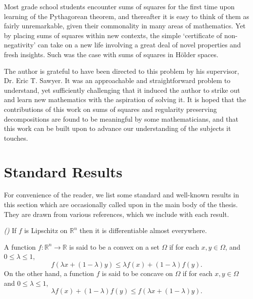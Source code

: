 \documentclass[oneside,hidelinks,indentfirst,10pt]{book}
\begin{document}
Most grade school students encounter sums of squares for the first time upon learning of the Pythagorean theorem, and thereafter it is easy to think of them as fairly unremarkable, given their commonality in many areas of mathematics. Yet by placing sums of squares within new contexts, the simple `certificate of non-negativity' can take on a new life involving a great deal of novel properties and fresh insights. Such was the case with sums of squares in H\"older spaces.


The author is grateful to have been directed to this problem by his supervisor, Dr. Eric T. Sawyer. It was an approachable and straightforward problem to understand, yet sufficiently challenging that it induced the author to strike out and learn new mathematics with the aspiration of solving it. It is hoped that the contributions of this work on sums of squares and regularity preserving decompositions are found to be meaningful by some mathematicians, and that this work can be built upon to advance our understanding of the subjects it touches.%
\newpage
{}
\renewcommand\fbox{\fcolorbox{white}{white}}

\pagestyle{plain}

\appendix
\chapter{Standard Results}\label{chap:appendix}
\pagestyle{thesis}


For convenience of the reader, we list some standard and well-known results in this section which are occasionally called upon in the main body of the thesis. They are drawn from various references, which we include with each result.


\begin{thm}[Rademacher]\emph{(\cite[Theorem 5.2]{simon})}\label{thm:rad}
If \(f\) is Lipschitz on \(\mathbb{R}^n\) then it is differentiable almost everywhere.
\end{thm}


\begin{defn}\label{lem:convexity}
A function \(f:\mathbb{R}^n\rightarrow\mathbb{R}\) is said to be a convex on a set \(\Omega\) if for each \(x,y\in\Omega\), and \(0\leq \lambda\leq1\),
\[
    f(\lambda x+(1-\lambda)y)\leq\lambda f(x)+(1-\lambda)f(y).
\]
On the other hand, a function \(f\) is said to be concave on \(\Omega\) if for each \(x,y\in\Omega\) and \(0\leq \lambda\leq1\),
\[
    \lambda f(x)+(1-\lambda)f(y)\leq f(\lambda x+(1-\lambda)y).
\]
\end{defn}
\end{document}
